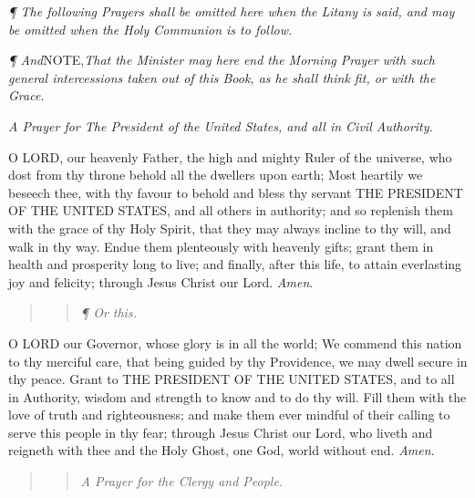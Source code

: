 \emph{¶
The following Prayers shall be omitted here when the Litany is said,
and may be omitted when the Holy Communion is to follow.}

\emph{¶
And}NOTE,\emph{That the Minister may here end the Morning Prayer with such general intercessions
taken out of this Book, as he shall think fit, or with the Grace.}

\emph{A
Prayer for The President of the United States, and all in Civil Authority.}

O
LORD, our heavenly Father, the high and mighty Ruler of the universe,
who dost from thy throne behold all the dwellers upon earth; Most heartily
we beseech thee, with thy favour to behold and bless thy servant THE
PRESIDENT OF THE UNITED
STATES, and all others in authority; and so replenish
them with the grace of thy Holy Spirit, that they may always incline to
thy will, and walk in thy way. Endue them plenteously with heavenly gifts;
grant them in health and prosperity long to live; and finally, after this
life, to attain everlasting joy and felicity; through Jesus Christ our
Lord. \emph{Amen}.

\begin{quote}

\begin{quote}

\emph{¶ Or this.}

\end{quote}

\end{quote}

O
LORD our Governor, whose glory is in all the world; We commend this nation
to thy merciful care, that being guided by thy Providence, we may dwell
secure in thy peace. Grant to THE PRESIDENT
OF THE UNITED STATES,
and to all in Authority, wisdom and strength to know and to do thy will.
Fill them with the love of truth and righteousness; and make them ever
mindful of their calling to serve this people in thy fear; through Jesus
Christ our Lord, who liveth and reigneth with thee and the Holy Ghost,
one God, world without end. \emph{Amen}.

\begin{quote}

\begin{quote}

\emph{A
Prayer for the Clergy and People.}

\end{quote}

\end{quote}

